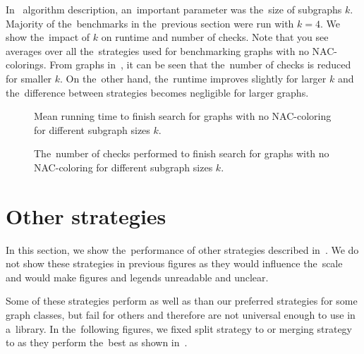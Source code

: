 In~\Subgraphs{} algorithm description, an~important parameter was the~size of subgraphs \( k \).
Majority of the~benchmarks in the~previous section were run with \( k = 4 \).
%
We show the~impact of	\( k \) on runtime and number of checks.
Note that you see averages over all the~strategies used for benchmarking
graphs with no NAC-colorings.
%
From graphs in~,
it can be seen that the~number of checks is reduced for smaller \( k \).
On the~other hand, the~runtime improves slightly for larger \( k \)
and the~difference between strategies becomes negligible for larger graphs.

\begin{figure}[thbp]
	\centering
	\scalebox{\BenchFigureScale}{}
	\caption[Mean runtime for graphs with no NAC-coloring]{
		Mean running time to finish search for graphs with no NAC-coloring for different subgraph sizes \( k \).}%
	\label{fig:graph_no_nac_coloring_first_runtime_subgraph_size}
\end{figure}%
\begin{figure}[thbp]
	\centering
	\scalebox{\BenchFigureScale}{}
	\caption[Checks performed for graphs with no NAC-coloring]{
		The~number of checks performed to finish search for graphs with no NAC-coloring for different subgraph sizes \( k \).}%
	\label{fig:graph_no_nac_coloring_first_checks_subgraph_size}
\end{figure}%


\section{Other strategies}%
\label{sec:other_strategies}

In this section, we show the~performance of other strategies described in~.
We do not show these strategies in previous figures as they would influence
the~scale and would make figures and legends unreadable and unclear.

Some of these strategies perform as well as
than our preferred strategies for some graph classes,
but fail for others and therefore are not universal enough to use in a~library.
%
In the~following figures, we fixed
split strategy to \Neighbors{} or merging strategy to \MergeLinear{}
as they perform the~best as shown in~.

